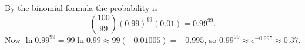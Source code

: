 By the binomial formula the probability is
\[\binom{100}{99}(0.99)^{99}(0.01)=0.99^{99}.\]
Now $\ln0.99^{99}=99\ln0.99\approx99(-0.01005)=-0.995$, so $0.99^{99}\approx e^{-0.995}\approx\boxed{0.37}$.
